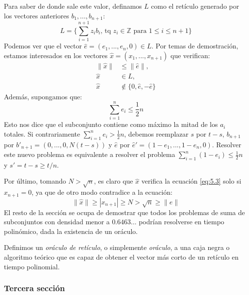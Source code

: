     Para saber de donde sale este valor, definamos $L$ como el retículo generado por los vectores anteriores $b_{1}, ... , b_{n+1}$:
    \begin{equation}
        L = \{\sum_{i=1}^{n+1} z_{i}b_{i} \text{, tq } z_{i} \in \mathbb{Z} \text{ para } 1 \leq i \leq n+1\}
    \end{equation}
    Podemos ver que el vector $\hat{e} = (e_{1}, ... , e_{n}, 0) \in L$. Por temas de demostración, estamos interesados en los vectores $\hat{x} = (x_{1}, ... , x_{n+1})$ que verifican:
    \begin{align} \label{eq:5.3}
        \| \hat{x} \| &\leq \| \hat{e} \|, \\
        \hat{x} &\in L, \\
        \hat{x} &\notin \{0, \hat{e}, -\hat{e}\}
    \end{align}
    Además, supongamos que:
    \begin{equation}
        \sum_{i=1}^{n} e_{i} \leq \frac{1}{2}n
    \end{equation}
    Esto nos dice que el subconjunto contiene como máximo la mitad de los $a_{i}$ totales. Si contrariamente $\sum_{i=1}^{n} e_{i} > \frac{1}{2}n$, debemos reemplazar $s$ por $t-s$, $b_{n+1}$ por $b'_{n+1} = (0, ... , 0, N(t-s))$ y $\hat{e}$ por $\hat{e}' = (1 - e_{1}, ... , 1 - e_{n}, 0)$. Resolver este nuevo problema es equivalente a resolver el problema $\sum_{i=1}^{n} (1-e_{i}) \leq \frac{1}{2}n$ y $s' = t - s \geq t/n$.

    Por último, tomando $N > \sqrt{n}$, es claro que $\hat{x}$ verifica la ecuación \eqref{eq:5.3} solo si $x_{n+1} = 0$, ya que de otro modo contradice a la ecuación:
    \begin{equation}
        \| \hat{x} \| \geq \left| x_{n+1} \right| \geq N > \sqrt{n} \geq \| \hat{e} \|
    \end{equation}
   El resto de la sección se ocupa de demostrar que todos los problemas de suma de subconjuntos con densidad menor a $0.6463...$ podrían resolverse en tiempo polinómico, dada la existencia de un oráculo.

    \begin{definicion}
        Definimos un \textit{oráculo de retículo}, o simplemente \textit{oráculo}, a una caja negra o algoritmo teórico que es capaz de obtener el vector más corto de un retículo en tiempo polinomial.
    \end{definicion}

    \subsubsection{Tercera sección}

